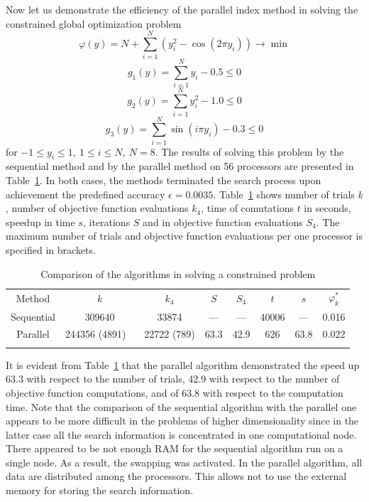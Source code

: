 \begin{example}
Now let us demonstrate the efficiency of the parallel index method in solving the constrained global optimization problem
\[
\varphi(y) = N + \sum_{i=1}^N{\left(y_i^2-\cos(2\pi y_i)\right)}\rightarrow\min 
\]
\[
g_1(y) = \sum_{i=1}^N{y_i} - 0.5 \leq 0
\]
\[
g_2(y) = \sum_{i=1}^N{y_i^2} - 1.0 \leq 0
\]
\[
g_3(y) = \sum_{i=1}^N{\sin(i\pi y_i)} - 0.3 \leq 0
\]
for $-1\leq y_i\leq 1,\ 1\leq i\leq N,\ N=8$. The results of solving this problem by the sequential method and by the parallel method on 56 processors are presented in Table~\ref{6_tab_l2}. In both cases, the methods terminated the search process upon achievement the predefined accuracy $\epsilon = 0.0035$. Table~\ref{6_tab_l2} shows number of trials $k$, number of objective function evaluations $k_4$, time of comutations $t$ in seconds, speedup in time $s$, iterations $S$ and in objective function evaluations $S_4$.
The maximum number of trials and objective function evaluations per one processor is specified in brackets.

	\begin{table}
	\caption{Comparison of the algorithms in solving a constrained problem}
	\label{6_tab_l2}
	\center
	\begin{tabular}{cccccccc}
		\hline\noalign{\smallskip}
		 Method & $k$ & $k_4$ & $S$ & $S_4$ & $t$ & $s$ & $\varphi_k^\ast$  \\
		\noalign{\smallskip} \hline \noalign{\smallskip}
		Sequential	&	309640 &	33874 & ---	& --- &	40006 & ---	&	0.016	\\
		Parallel	&	244356 (4891) \ &	22722 (789) & 63.3	& 42.9 &	626 & 63.8 	&	0.022	\\
		\noalign{\smallskip}\hline
	\end{tabular}
\end{table}

It is evident from Table~\ref{6_tab_l2} that the parallel algorithm demonstrated the speed up 63.3 with respect to the number of trials, 42.9 with respect to the number of objective function computations, and of 63.8 with respect to the computation time.
Note that the comparison of the sequential algorithm with the parallel one appears to be more difficult in the problems of higher dimensionality since in the latter case all the search information is concentrated in one computational node. There appeared to be not enough RAM for the sequential algorithm run on a single node. As a result, the swapping was activated. In the parallel algorithm, all data are distributed among the processors. This allows not to use the external memory for storing the search information.

\end{example}

